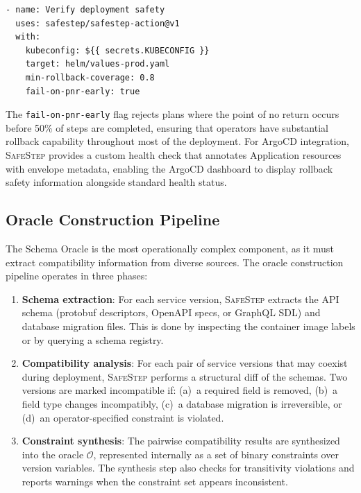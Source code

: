 \documentclass[10pt,twocolumn]{article}
\newcommand{\safestep}{\textsc{SafeStep}}
\begin{document}
\begin{lstlisting}[caption={GitHub Actions integration.},
  label=lst:cicd]
- name: Verify deployment safety
  uses: safestep/safestep-action@v1
  with:
    kubeconfig: ${{ secrets.KUBECONFIG }}
    target: helm/values-prod.yaml
    min-rollback-coverage: 0.8
    fail-on-pnr-early: true
\end{lstlisting}

\noindent
The \texttt{fail-on-pnr-early} flag rejects plans where the
point of no return occurs before 50\% of steps are completed,
ensuring that operators have substantial rollback capability
throughout most of the deployment. For ArgoCD integration,
\safestep{} provides a custom health check that annotates
Application resources with envelope metadata, enabling the
ArgoCD dashboard to display rollback safety information
alongside standard health status.

\subsection{Oracle Construction Pipeline}

The Schema Oracle is the most operationally complex component,
as it must extract compatibility information from diverse
sources. The oracle construction pipeline operates in three
phases:

\begin{enumerate}[leftmargin=*,nosep]
  \item \textbf{Schema extraction}: For each service version,
    \safestep{} extracts the API schema (protobuf descriptors,
    OpenAPI specs, or GraphQL SDL) and database migration files.
    This is done by inspecting the container image labels or by
    querying a schema registry.
  \item \textbf{Compatibility analysis}: For each pair of
    service versions that may coexist during deployment,
    \safestep{} performs a structural diff of the schemas.
    Two versions are marked incompatible if: (a)~a required
    field is removed, (b)~a field type changes incompatibly,
    (c)~a database migration is irreversible, or (d)~an
    operator-specified constraint is violated.
  \item \textbf{Constraint synthesis}: The pairwise
    compatibility results are synthesized into the oracle
    $\mathcal{O}$, represented internally as a set of
    binary constraints over version variables. The synthesis
    step also checks for transitivity violations and
    reports warnings when the constraint set appears
    inconsistent.
\end{enumerate}
\end{document}
